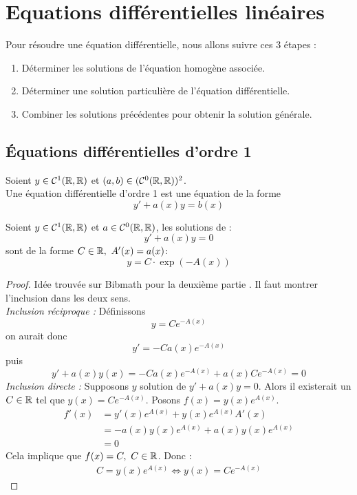 \chapter{Equations différentielles linéaires}

\noindent Pour résoudre une équation différentielle, nous allons suivre ces 3 étapes :
\begin{enumerate}
	\item Déterminer les solutions de l'équation homogène associée.
	\item Déterminer une solution particulière de l'équation différentielle.
	\item Combiner les solutions précédentes pour obtenir la solution générale.
\end{enumerate}

\section{\'Equations différentielles d'ordre 1}

\begin{definition}
	Soient $y \in \mathcal{C}^1(\mathbb{R},\mathbb{R})$ et $(a, b) \in (\mathcal{C}^0(\mathbb{R},\mathbb{R}))^2$. \\
	Une équation différentielle d'ordre 1 est une équation de la forme
	\[ y' + a(x)y = b(x) \]
\end{definition}

\begin{theorem}
	Soient $y \in \mathcal{C}^1(\mathbb{R}, \mathbb{R})$ et $a \in \mathcal{C}^0(\mathbb{R}, \mathbb{R})$, les solutions de :
	\[ y' + a(x)y = 0 \]
	sont de la forme $C \in \mathbb{R},\ A'(x) = a(x)$:
	\[ y = C \cdot \exp(-A(x)) \]
\end{theorem}

\begin{proof}Idée trouvée sur Bibmath pour la deuxième partie  \cite{bibmath_resolution_eq_diff}.
    Il faut montrer l'inclusion dans les deux sens. \\
    \emph{Inclusion réciproque :}
	Définissons
	\[ y = C e^{-A(x)} \]
	on aurait donc
	\[ y' = -C a(x)e^{-A(x)} \]
	puis
	\[ y' + a(x)y(x) = -C a(x) e^{-A(x)} + a(x)Ce^{-A(x)} = 0 \]
    \emph{Inclusion directe :}
    Supposons $y$ solution de $y' + a(x) y = 0$.
    Alors il existerait un $C \in \mathbb{R}$ tel que $y(x) = Ce^{-A(x)}$.
    Posons $f(x) = y(x)e^{A(x)}$.
    \begin{align*}
        f'(x) &= y'(x)e^{A(x)} + y(x)e^{A(x)}A'(x) \\
        &= -a(x)y(x)e^{A(x)} + a(x)y(x)e^{A(x)} \\
        &= 0
    \end{align*}
    Cela implique que $f(x) = C,\ C \in \mathbb{R}$. Donc :
    \begin{align*}
        C = y(x)e^{A(x)} \iff y(x) = Ce^{-A(x)}
    \end{align*}
\end{proof}


